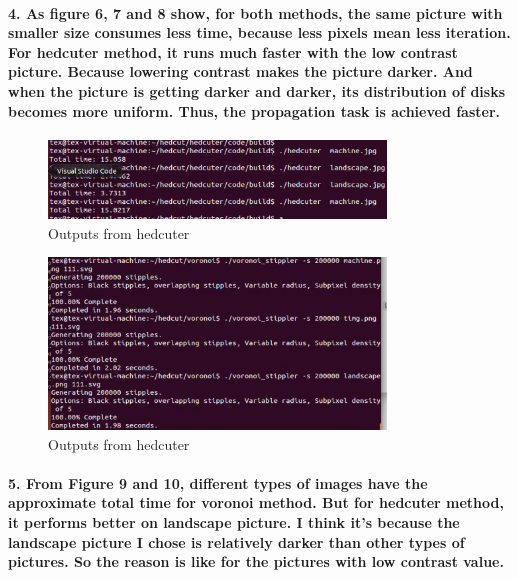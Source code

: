 \documentclass[11pt]{article}
\begin{document}
\paragraph{4. As figure 6, 7 and 8 show, for both methods, the same picture with smaller size consumes less time, because less pixels mean less iteration. For hedcuter method, it runs much faster with the low contrast picture. Because lowering contrast makes the picture darker. And when the picture is getting darker and darker, its distribution of disks becomes more uniform. Thus, the propagation task is achieved faster.  }

\begin{figure}[h!]
\centering
\includegraphics[width=0.80\textwidth]{figure9.eps}
\caption{Outputs from hedcuter}
\label{threadsVsSync}
\end{figure}
\begin{figure}[h!]
\centering
\includegraphics[width=0.80\textwidth]{figure10.eps}
\caption{Outputs from hedcuter}
\label{threadsVsSync}
\end{figure}
\paragraph{5. From Figure 9 and 10, different types of images have the approximate total time for voronoi method. But for hedcuter method, it performs better on landscape picture. I think it's because the landscape picture I chose is relatively darker than other types of pictures. So the reason is like for the pictures with low contrast value.  }
\end{document}
